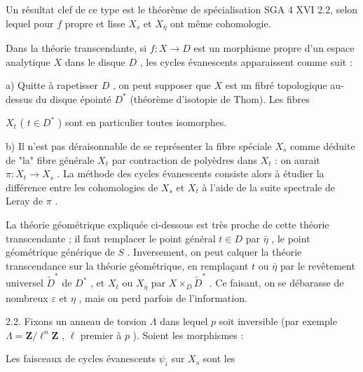 Un résultat clef de ce type est le théorème de spécialisation SGA 4 XVI 2.2, selon lequel pour  $f$  propre et lisse  $X_s$  et  $X_{\bar{\eta}}$  ont même cohomologie.

Dans la théorie transcendante, si  $f : X \longrightarrow D$  est un morphisme propre d'un espace analytique  $X$  dans le disque  $D$ , les cycles évanescents apparaissent comme suit :

a) Quitte à rapetisser  $D$ , on peut supposer que  $X$  est un fibré topologique au-dessus du disque épointé  $D^{*}$  (théorème d'isotopie de Thom). Les fibres



$X_t$ ( $t \in D^{*}$ )  sont en particulier toutes isomorphes.

b) Il n'est pas déraisonnable de se représenter la fibre spéciale  $X_s$  comme déduite de "la" fibre générale  $X_t$  par contraction de polyèdres dans  $X_t$ : on aurait $\pi : X_t \longrightarrow X_s$ . La méthode des cycles évanescents consiste alors à étudier la différence entre les cohomologies de  $X_s$  et  $X_t$  à l'aide de la suite spectrale de Leray de  $\pi$ .

La théorie géométrique expliquée ci-dessous est très proche de cette théorie transcendante ; il faut remplacer le point général  $t \in D$  par  $\bar{\eta}$ , le point géométrique générique de  $S$ . Inversement, on peut calquer la théorie transcendance sur la théorie géométrique, en remplaçant  $t$  ou  $\bar{\eta}$  par le revêtement universel  $\widetilde{D}^{*}$  de  $D^{*}$ , et $X_t$  ou  $X_{\bar{\eta}}$  par  $X \times_D \widetilde{D}^{*}$ . Ce faisant, on se débarasse de nombreux  $\varepsilon$  et  $\eta$ , mais on perd parfois de l'information.

2.2. Fixons un anneau de torsion  $\Lambda$  dans lequel  $p$  soit inversible (par exemple $\Lambda = \mathbf{Z}/\ell^n\mathbf{Z}$ ,  $\ell$  premier à  $p$ ). Soient les morphismes :

\begin{center}
\end{center}
Les faisceaux de cycles évanescents  $\psi_i$  sur  $X_s$  sont les

